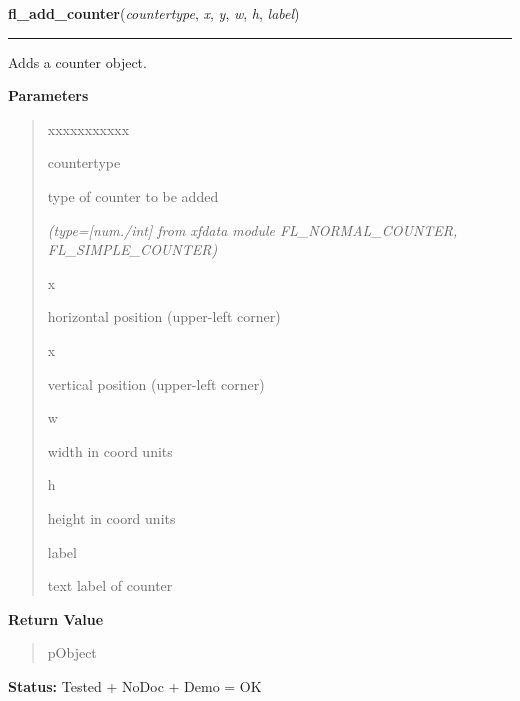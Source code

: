 \hspace{.8\funcindent}\begin{boxedminipage}{\funcwidth}

    \raggedright \textbf{fl\_add\_counter}(\textit{countertype}, \textit{x}, \textit{y}, \textit{w}, \textit{h}, \textit{label})

    \vspace{-1.5ex}

    \rule{\textwidth}{0.5\fboxrule}
\setlength{\parskip}{2ex}
    Adds a counter object.

\setlength{\parskip}{1ex}
      \textbf{Parameters}
      \vspace{-1ex}

      \begin{quote}
        \begin{Ventry}{xxxxxxxxxxx}

          \item[countertype]

          type of counter to be added

            {\it (type=[num./int] from xfdata module FL\_NORMAL\_COUNTER, FL\_SIMPLE\_COUNTER)}

          \item[x]

          horizontal position (upper-left corner)

          \item[x]

          vertical position (upper-left corner)

          \item[w]

          width in coord units

          \item[h]

          height in coord units

          \item[label]

          text label of counter

        \end{Ventry}

      \end{quote}

      \textbf{Return Value}
    \vspace{-1ex}

      \begin{quote}
      pObject

      \end{quote}

\textbf{Status:} Tested + NoDoc + Demo = OK



    \end{boxedminipage}

